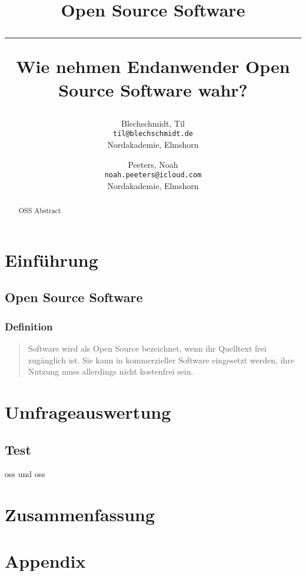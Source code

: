 \documentclass[a4paper]{article}
\title{Open Source Software \\
    \noindent\rule[0.25ex]{\linewidth}{0.5pt}
    \large Wie nehmen Endanwender Open Source Software wahr?
}
\author{
  Blechschmidt, Til\\
  \texttt{til@blechschmidt.de}\\
  Nordakademie, Elmshorn
  \and
  Peeters, Noah\\
  \texttt{noah.peeters@icloud.com}\\
  Nordakademie, Elmshorn
}
\begin{document}
    \thispagestyle{fancy}
    \maketitle

    \begin{abstract}
         OSS Abstract
    \end{abstract}
    \newpage

    \tableofcontents
    \clearpage

    \section{Einführung}
        \subsection{Open Source Software}
            \subsubsection{Definition}
                \begin{quote} 
                    \centering 
                    Software wird als Open Source bezeichnet, wenn ihr Quelltext frei zugänglich ist. Sie kann in kommerzieller Software eingesetzt werden, ihre Nutzung muss allerdings nicht kostenfrei sein. 
                \end{quote}
        
    \section{Umfrageauswertung}
        \subsection{Test}
            \gls{oss} und \gls{oss}
    
    \section{Zusammenfassung}
    
    \clearpage
    \section*{Appendix}
    
        \printglossary[type=\acronymtype]
        \printglossary
        
        \clearpage
        \nocite{*}
        \printbibliography
        
        \listoffigures
\end{document}
